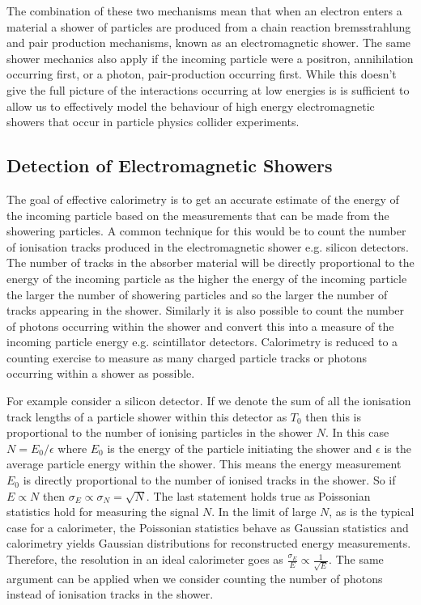 The combination of these two mechanisms mean that when an electron enters a material a shower of particles are produced from a chain reaction bremsstrahlung and pair production mechanisms, known as an electromagnetic shower.  The same shower mechanics also apply if the incoming particle were a positron, annihilation occurring first, or a photon, pair-production occurring first.  While this doesn't give the full picture of the interactions occurring at low energies is is sufficient to allow us to effectively model the behaviour of high energy electromagnetic showers that occur in particle physics collider experiments.

\subsection{Detection of Electromagnetic Showers}
The goal of effective calorimetry is to get an accurate estimate of the energy of the incoming particle based on the measurements that can be made from the showering particles.  A common technique for this would be to count the number of ionisation tracks produced in the electromagnetic shower e.g. silicon detectors.  The number of tracks in the absorber material will be directly proportional to the energy of the incoming particle as the higher the energy of the incoming particle the larger the number of showering particles and so the larger the number of tracks appearing in the shower.  Similarly it is also possible to count the number of photons occurring within the shower and convert this into a measure of the incoming particle energy e.g. scintillator detectors.  Calorimetry is reduced to a counting exercise to measure as many charged particle tracks or photons occurring within a shower as possible.

For example consider a silicon detector.  If we denote the sum of all the ionisation track lengths of a particle shower within this detector as $T_{0}$ then this is proportional to the number of ionising particles in the shower $N$.  In this case $N = E_{0}/\epsilon$ where $E_{0}$ is the energy of the particle initiating the shower and $\epsilon$ is the average particle energy within the shower.  This means the energy measurement $E_{0}$ is directly proportional to the number of ionised tracks in the shower.  So if $E \propto N$ then $\sigma_{E} \propto \sigma_{N} = \sqrt{N}$.  The last statement holds true as Poissonian statistics hold for measuring the signal $N$.  In the limit of large $N$, as is the typical case for a calorimeter, the Poissonian statistics behave as Gaussian statistics and calorimetry yields Gaussian distributions for reconstructed energy measurements.  Therefore, the resolution in an ideal calorimeter goes as $\frac{\sigma_{E}}{E} \propto \frac{1}{\sqrt{E}}$.  The same argument can be applied when we consider counting the number of photons instead of ionisation tracks in the shower.

